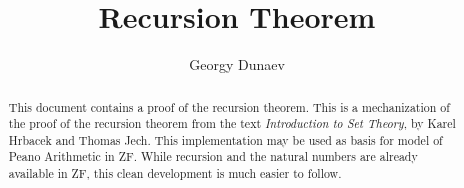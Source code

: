 \documentclass[11pt,a4paper]{article}
\begin{document}
\title{Recursion Theorem}
\author{Georgy Dunaev}
\maketitle

\begin{abstract}
  This document contains a proof of the recursion theorem.
  This is a mechanization of the proof of the recursion theorem from 
  the text \textit{Introduction to Set Theory}, by Karel Hrbacek 
  and Thomas Jech. This implementation may be used as basis for 
  model of Peano Arithmetic in ZF\@. While recursion and the natural
  numbers are already available in ZF, this clean development
  is much easier to follow.
\end{abstract}

\tableofcontents





\end{document}
